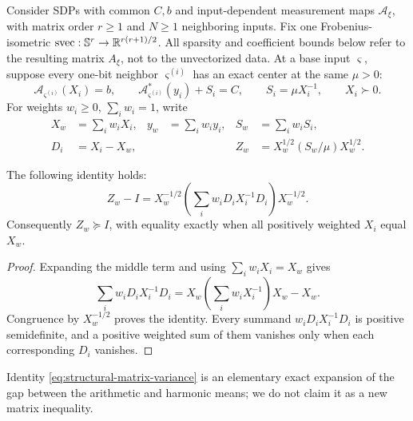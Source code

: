 Consider SDPs with common $C,b$ and
input-dependent measurement maps $\mathcal A_\xi$, with matrix order $r\geq1$
and $N\geq1$ neighboring inputs.  Fix one Frobenius-isometric
$\operatorname{svec}:\mathbb{S}^r\to\mathbb{R}^{r(r+1)/2}$.  All sparsity and coefficient
bounds below refer to the resulting matrix $A_\xi$, not to the unvectorized
data.  At a base input $\varsigma$, suppose every one-bit neighbor
$\varsigma^{(i)}$ has an exact center at the same $\mu>0$:
\begin{equation}
 \mathcal A_{\varsigma^{(i)}}(X_i)=b,\qquad
 \mathcal A_{\varsigma^{(i)}}^*(y_i)+S_i=C,\qquad
 S_i=\mu X_i^{-1},\qquad X_i\succ0.                       \label{eq:structural-sdp-centers}
\end{equation}
For weights $w_i\geq0$, $\sum_iw_i=1$, write
\begin{equation}
 \begin{aligned}
 X_w&=\sum_iw_iX_i,& y_w&=\sum_iw_iy_i,&
 S_w&=\sum_iw_iS_i,\\
 D_i&=X_i-X_w,&&&
 Z_w&=X_w^{1/2}(S_w/\mu)X_w^{1/2}.
 \end{aligned}                                            \label{eq:structural-sdp-average}
\end{equation}

\begin{lemma}
\label{lem:structural-matrix-variance}
The following identity holds:
\begin{equation}
 \boxed{
 Z_w-I=X_w^{-1/2}\left(\sum_iw_iD_iX_i^{-1}D_i\right)X_w^{-1/2}.}
                                                               \label{eq:structural-matrix-variance}
\end{equation}
Consequently $Z_w\succeq I$, with equality exactly when all positively
weighted $X_i$ equal $X_w$.
\end{lemma}

\begin{proof}
Expanding the middle term and using $\sum_iw_iX_i=X_w$ gives
\[
 \sum_iw_iD_iX_i^{-1}D_i
 =X_w\left(\sum_iw_iX_i^{-1}\right)X_w-X_w.
\]
Congruence by $X_w^{-1/2}$ proves the identity.  Every summand $w_iD_iX_i^{-1}D_i$ is
positive semidefinite, and a positive weighted sum of them vanishes only
when each corresponding $D_i$ vanishes.
\end{proof}

Identity \eqref{eq:structural-matrix-variance} is an elementary exact
expansion of the gap between the arithmetic and harmonic means; we do not
claim it as a new matrix inequality.

